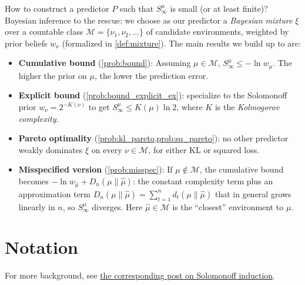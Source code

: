 \documentclass[fontsize=11pt, parskip=half]{scrartcl}
\newcommand{\Mc}{\mathcal{M}}
\begin{document}
How to construct a predictor $P$ such that $S^\mu_\infty$ is small (or at least finite)? Bayesian inference to the rescue: we choose as our predictor a \emph{Bayesian mixture} $\xi$ over a countable class $\Mc = \{\nu_1, \nu_2, \dots\}$ of candidate environments, weighted by prior beliefs $w_\nu$ (formalized in \cref{def:mixture}). The main results we build up to are:
\begin{itemize}\itemsep=2pt
  \item \textbf{Cumulative bound} (\cref{prob:bound}): Assuming $\mu \in \Mc$, $S^\mu_\infty \leq -\ln w_\mu$. The higher the prior
  on $\mu$, the lower the prediction error.
  \item \textbf{Explicit bound} (\cref{prob:bound_explicit_ex}): specialize to the Solomonoff prior $w_\nu = 2^{-K(\nu)}$ to get $S^\mu_\infty \leq K(\mu)\ln 2$, where $K$ is the \emph{Kolmogorov complexity}.
  \item \textbf{Pareto optimality} (\cref{prob:kl_pareto,prob:sq_pareto}): no other predictor weakly dominates $\xi$ on every $\nu \in \Mc$, for either KL or squared loss.
  \item \textbf{Misspecified version} (\cref{prob:misspec}): If $\mu \not\in \Mc$, the cumulative bound becomes $-\ln w_{\hat\mu} + D_n(\mu \parallel \hat\mu)$: the constant complexity term plus an approximation term $D_n(\mu \parallel \hat\mu) = \sum_{t=1}^n d_t(\mu \parallel \hat\mu)$ that in general grows linearly in $n$, so $S^\mu_\infty$ diverges. Here $\hat{\mu} \in \Mc$ is the ``closest'' environment to $\mu$.
\end{itemize}

\section*{Notation}

For more background, see \href{https://www.lesswrong.com/posts/HSDumToH57nSRdLST/a-technical-introduction-to-solomonoff-induction-without-k}{the corresponding post on Solomonoff induction}.
\end{document}
